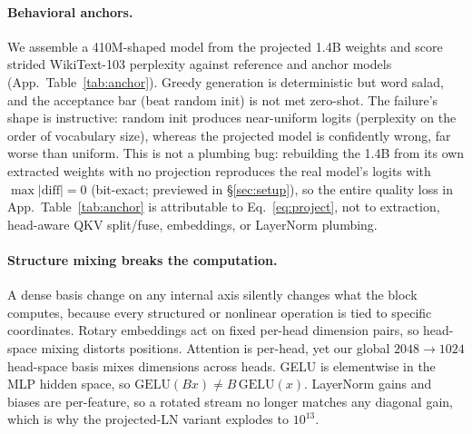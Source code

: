 \paragraph{Behavioral anchors.}
We assemble a 410M-shaped model from the projected 1.4B weights and score strided
WikiText-103 perplexity against reference and anchor models
(App.~Table~\ref{tab:anchor}). Greedy generation is deterministic but word salad, and
the acceptance bar (beat random init) is not met zero-shot. The failure's
shape is instructive: random init produces near-uniform logits (perplexity
on the order of vocabulary size), whereas the projected model is confidently
wrong, far worse than uniform. This is not a plumbing bug: rebuilding the 1.4B
from its own extracted weights with no projection reproduces the real
model's logits with $\max|\text{diff}| = 0$ (bit-exact; previewed in
\S\ref{sec:setup}), so the entire quality loss in App.~Table~\ref{tab:anchor} is
attributable to Eq.~\ref{eq:project}, not to extraction, head-aware QKV
split/fuse, embeddings, or LayerNorm plumbing.

\paragraph{Structure mixing breaks the computation.}
A dense basis change on any internal axis silently changes what the block
computes, because every structured or nonlinear operation is tied to
specific coordinates. Rotary embeddings act on fixed per-head dimension
pairs, so head-space mixing distorts positions. Attention is per-head, yet
our global $2048\!\to\!1024$ head-space basis mixes dimensions across
heads. GELU is elementwise in the MLP hidden space, so
$\mathrm{GELU}(Bx)\neq B\,\mathrm{GELU}(x)$. LayerNorm gains and biases are
per-feature, so a rotated stream no longer matches any diagonal gain, which is
why the projected-LN variant explodes to $10^{13}$.

